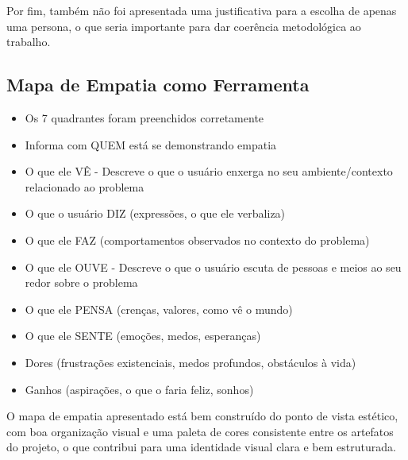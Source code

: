 \documentclass[
  sigconf,
  nonacm, %
  language=portuguese
]{acmart}
\newcommand{\statuswarn}[1]{{\small\bfseries\color{cwarn}#1}}
\begin{document}
Por fim, também não foi apresentada uma justificativa para a escolha de apenas uma persona, o que seria importante para dar coerência metodológica ao trabalho.

\subsection{Mapa de Empatia como Ferramenta}

\noindent\statuswarn{0,85\,/\,1,00 pts · Completo c/ ressalvas}

\begin{itemize}[leftmargin=14pt,itemsep=1pt,topsep=3pt,parsep=0pt]
  \item[$\square$] {\small\textcolor{cmuted}{Os 7 quadrantes foram preenchidos corretamente}}
  \item[$\square$] {\small\textcolor{cmuted}{Informa com QUEM está se demonstrando empatia}}
  \item[\textcolor{cgood}{$\checkmark$}] {\small\textcolor{cgood}{O que ele VÊ - Descreve o que o usuário enxerga no seu ambiente/contexto relacionado ao problema}}
  \item[\textcolor{cgood}{$\checkmark$}] {\small\textcolor{cgood}{O que o usuário DIZ (expressões, o que ele verbaliza)}}
  \item[\textcolor{cgood}{$\checkmark$}] {\small\textcolor{cgood}{O que ele FAZ (comportamentos observados no contexto do problema)}}
  \item[\textcolor{cgood}{$\checkmark$}] {\small\textcolor{cgood}{O que ele OUVE - Descreve o que o usuário escuta de pessoas e meios ao seu redor sobre o problema}}
  \item[\textcolor{cgood}{$\checkmark$}] {\small\textcolor{cgood}{O que ele PENSA (crenças, valores, como vê o mundo)}}
  \item[\textcolor{cgood}{$\checkmark$}] {\small\textcolor{cgood}{O que ele SENTE (emoções, medos, esperanças)}}
  \item[\textcolor{cgood}{$\checkmark$}] {\small\textcolor{cgood}{Dores (frustrações existenciais, medos profundos, obstáculos à vida)}}
  \item[\textcolor{cgood}{$\checkmark$}] {\small\textcolor{cgood}{Ganhos (aspirações, o que o faria feliz, sonhos)}}
\end{itemize}

O mapa de empatia apresentado está bem construído do ponto de vista estético, com boa organização visual e uma paleta de cores consistente entre os artefatos do projeto, o que contribui para uma identidade visual clara e bem estruturada.
\end{document}
